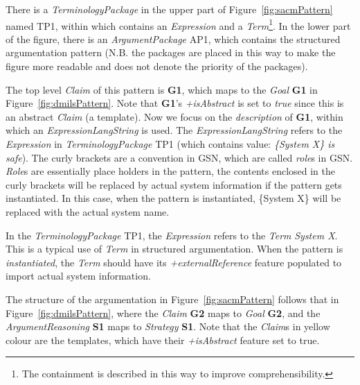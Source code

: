 There is a \textit{TerminologyPackage} in the upper part of Figure~\ref{fig:sacmPattern} named TP1, within which contains an \textit{Expression} and a \textit{Term}\footnote{The containment is described in this way to improve comprehensibility.}. 
In the lower part of the figure, there is an \textit{ArgumentPackage} AP1, which contains the structured argumentation pattern (N.B. the packages are placed in this way to make the figure more readable and does not denote the priority of the packages).

The top level \textit{Claim} of this pattern is \textbf{G1}, which maps to the \textit{Goal} \textbf{G1} in Figure~\ref{fig:dmilsPattern}. 
Note that \textbf{G1}'s \textit{+isAbstract} is set to \textit{true} since this is an abstract \textit{Claim} (a template). Now we focus on the \textit{description} of \textbf{G1}, within which an \textit{ExpressionLangString} is used. 
The \textit{ExpressionLangString} refers to the \textit{Expression} in \textit{TerminologyPackage} TP1 (which contains value: \textit{\{System X\} is safe}). 
The curly brackets are a convention in GSN, which are called \textit{role}s in GSN. 
\textit{Role}s are essentially place holders in the pattern, the contents enclosed in the curly brackets will be replaced by actual system information if the pattern gets instantiated. 
In this case, when the pattern is instantiated, \{System X\} will be replaced with the actual system name. 

In the \textit{TerminologyPackage} TP1, the \textit{Expression} refers to the \textit{Term} \textit{System X}. 
This is a typical use of \textit{Term} in structured argumentation. 
When the pattern is \textit{instantiated}, the \textit{Term} should have its \textit{+externalReference} feature populated to import actual system information. 

The structure of the argumentation in Figure~\ref{fig:sacmPattern} follows that in Figure~\ref{fig:dmilsPattern}, where the \textit{Claim} \textbf{G2} maps to \textit{Goal} \textbf{G2}, and the \textit{ArgumentReasoning} \textbf{S1} maps to \textit{Strategy} \textbf{S1}. 
Note that the \textit{Claim}s in yellow colour are the templates, which have their \textit{+isAbstract} feature set to true. 

